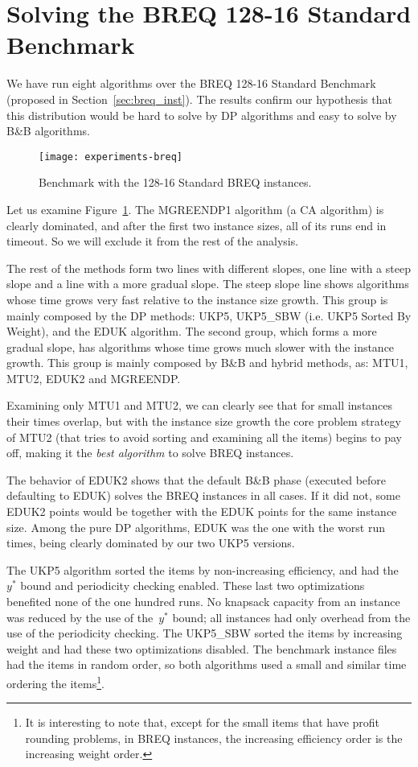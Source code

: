 \section{Solving the BREQ 128-16 Standard Benchmark}
\label{sec:breq_exp}

We have run eight algorithms over the BREQ 128-16 Standard Benchmark (proposed in Section~\ref{sec:breq_inst}).
The results confirm our hypothesis that this distribution would be hard to solve by DP algorithms and easy to solve by B\&B algorithms.

\begin{figure}[h]
\caption{Benchmark with the 128-16 Standard BREQ instances.}
\begin{center}
\texttt{[image: experiments-breq]}
\end{center}
\label{fig:breq_bench}
\end{figure}

Let us examine Figure~\ref{fig:breq_bench}.
The MGREENDP1 algorithm (a CA algorithm) is clearly dominated, and after the first two instance sizes, all of its runs end in timeout.
So we will exclude it from the rest of the analysis.

The rest of the methods form two lines with different slopes, one line with a steep slope and a line with a more gradual slope.
The steep slope line shows algorithms whose time grows very fast relative to the instance size growth.
This group is mainly composed by the DP methods: UKP5, UKP5\_SBW (i.e. UKP5 Sorted By Weight), and the EDUK algorithm.
The second group, which forms a more gradual slope, has algorithms whose time grows much slower with the instance growth.
This group is mainly composed by B\&B and hybrid methods, as: MTU1, MTU2, EDUK2 and MGREENDP.

Examining only MTU1 and MTU2, we can clearly see that for small instances their times overlap, but with the instance size growth the core problem strategy of MTU2 (that tries to avoid sorting and examining all the items) begins to pay off, making it the \emph{best algorithm} to solve BREQ instances. 

The behavior of EDUK2 shows that the default B\&B phase (executed before defaulting to EDUK) solves the BREQ instances in all cases.
If it did not, some EDUK2 points would be together with the EDUK points for the same instance size.
Among the pure DP algorithms, EDUK was the one with the worst run times, being clearly dominated by our two UKP5 versions. 

The UKP5 algorithm sorted the items by non-increasing efficiency, and had the~\(y^*\) bound and periodicity checking enabled.
These last two optimizations benefited none of the one hundred runs.
No knapsack capacity from an instance was reduced by the use of the~\(y^*\) bound; all instances had only overhead from the use of the periodicity checking.
The UKP5\_SBW sorted the items by increasing weight and had these two optimizations disabled.
The benchmark instance files had the items in random order, so both algorithms used a small and similar time ordering the items\footnote{It is interesting to note that, except for the small items that have profit rounding problems, in BREQ instances, the increasing efficiency order is the increasing weight order.}.

